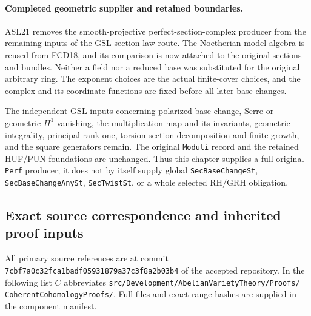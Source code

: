 \documentclass[11pt,a4paper]{article}
\numberwithin{equation}{section}
\theoremstyle{remark}\newtheorem{remark}[theorem]{Remark}
\begin{document}
\paragraph{Completed geometric supplier and retained boundaries.}
ASL21 removes the smooth-projective perfect-section-complex
producer from the remaining inputs of the GSL section-law route.
The Noetherian-model algebra is reused from FCD18, and its
comparison is now attached to the original sections and bundles.
Neither a field nor a reduced base was substituted for the
original arbitrary ring.  The exponent choices are the actual
finite-cover choices, and the complex and its coordinate functions
are fixed before all later base changes.

The independent GSL inputs concerning polarized base change,
Serre or geometric $H^1$ vanishing, the multiplication map and
its invariants, geometric integrality, principal rank one,
torsion-section decomposition and finite growth, and the square
generators remain.  The original \texttt{Moduli} record and
the retained HUF/PUN foundations are unchanged.  Thus this
chapter supplies a full original \texttt{Perf} producer;
it does not by itself supply global \texttt{Sec\allowbreak{}Base\allowbreak{}Change\allowbreak{}St},
\texttt{Sec\allowbreak{}Base\allowbreak{}Change\allowbreak{}Any\allowbreak{}St}, \texttt{Sec\allowbreak{}Twist\allowbreak{}St}, or a whole
selected RH/GRH obligation.

\subsection{Exact source correspondence and inherited proof inputs}

All primary source references are at commit
\texttt{7cbf7a0c32fca1badf05931879a37c3f8a2b03b4} of the
accepted repository.  In the following list $C$ abbreviates
\texttt{src/\allowbreak{}Development/\allowbreak{}Abelian\allowbreak{}Variety\allowbreak{}Theory/\allowbreak{}Proofs/\allowbreak{}}
\texttt{Coherent\allowbreak{}Cohomology\allowbreak{}Proofs/\allowbreak{}}.  Full files and exact
range hashes are supplied in the component manifest.
\end{document}
